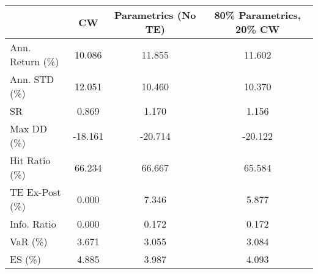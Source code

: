 \begin{tabular}{lccc}
\toprule
{} &      CW &  Parametrics (No TE) &  80\% Parametrics, 20\% CW \\
\midrule
Ann. Return (\%) &  10.086 &               11.855 &                   11.602 \\
Ann. STD (\%)    &  12.051 &               10.460 &                   10.370 \\
SR              &   0.869 &                1.170 &                    1.156 \\
Max DD (\%)      & -18.161 &              -20.714 &                  -20.122 \\
Hit Ratio (\%)   &  66.234 &               66.667 &                   65.584 \\
TE Ex-Post (\%)  &   0.000 &                7.346 &                    5.877 \\
Info. Ratio     &   0.000 &                0.172 &                    0.172 \\
VaR (\%)         &   3.671 &                3.055 &                    3.084 \\
ES (\%)          &   4.885 &                3.987 &                    4.093 \\
\bottomrule
\end{tabular}
